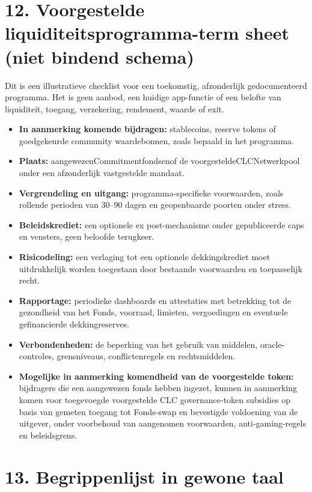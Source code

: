 \documentclass[11pt]{article}
\begin{document}
\section*{12. Voorgestelde liquiditeitsprogramma-term sheet (niet bindend schema)}

Dit is een illustratieve checklist voor een toekomstig, afzonderlijk gedocumenteerd programma. Het is geen aanbod, een huidige app-functie of een belofte van liquiditeit, toegang, verzekering, rendement, waarde of exit.

\begin{itemize}[leftmargin=*]
\item \textbf{In aanmerking komende bijdragen:} stablecoins, reserve tokens of goedgekeurde community waardebonnen, zoals bepaald in het programma.
\item \textbf{Plaats:} aangewezenCommitmentfondsenof de voorgesteldeCLCNetwerkpool onder een afzonderlijk vastgestelde mandaat.
\item \textbf{Vergrendeling en uitgang:} programma-specifieke voorwaarden, zoals rollende perioden van 30--90 dagen en geopenbaarde poorten onder stress.
\item \textbf{Beleidskrediet:} een optionele ex post-mechanisme onder gepubliceerde caps en vensters, geen beloofde terugkeer.
\item \textbf{Risicodeling:} een verlaging tot een optionele dekkingskrediet moet uitdrukkelijk worden toegestaan door bestaande voorwaarden en toepasselijk recht.
\item \textbf{Rapportage:} periodieke dashboards en attestaties met betrekking tot de gezondheid van het Fonds, voorraad, limieten, vergoedingen en eventuele gefinancierde dekkingreserves.
\item \textbf{Verbondenheden:} de beperking van het gebruik van middelen, oracle-controles, grensniveaus, conflictenregels en rechtsmiddelen.
\item \textbf{Mogelijke in aanmerking komendheid van de voorgestelde token:} bijdragers die een aangewezen fonds hebben ingezet, kunnen in aanmerking komen voor toegevoegde voorgestelde CLC governance-token subsidies op basis van gemeten toegang tot Fonds-swap en bevestigde voldoening van de uitgever, onder voorbehoud van aangenomen voorwaarden, anti-gaming-regels en beleidsgrens.
\end{itemize}


\section*{13. Begrippenlijst in gewone taal}
\end{document}
